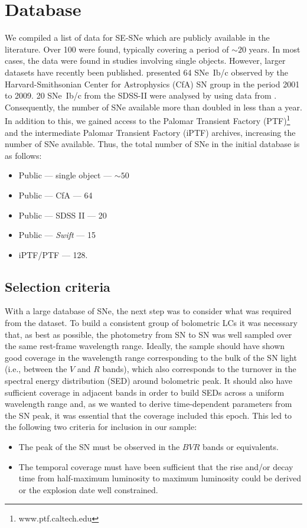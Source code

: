 \documentclass[a4paper,fleqn,usenatbib]{mnras}
\begin{document}
\section{Database}
We compiled a list of data for SE-SNe which are publicly available in the literature. Over 100 were found, typically covering a period of $\sim 20$ years. In most cases, the data were found in studies involving single objects. However, larger datasets have recently been published. \cite{Bianco2014} presented 64 SNe~Ib/c observed by the Harvard-Smithsonian Center for Astrophysics (CfA) SN group in the period 2001 to 2009. 20 SNe~Ib/c from the SDSS-II were analysed by \cite{Taddia2015} using data from \cite{Sako2014}. Consequently, the number of SNe available more than doubled in less than a year. In addition to this, we gained access to the Palomar Transient Factory (PTF)\footnote{www.ptf.caltech.edu} \citep{Law2009} and the intermediate Palomar Transient Factory (iPTF) archives, increasing the number of SNe available. Thus, the total number of SNe in the initial database is as follows: 
\begin{itemize}
	\item{Public --- single object --- $\sim 50$}
	\item{Public --- CfA --- 64}
	\item{Public --- SDSS II --- 20}
	\item{Public --- \textit{Swift} --- 15}
	\item{iPTF/PTF --- 128.}
\end{itemize}


\subsection{Selection criteria}
With a large database of SNe, the next step was to consider what was required from the dataset. To build a consistent group of bolometric LCs it was necessary that, as best as possible, the photometry from SN to SN was well sampled over the same rest-frame wavelength range. Ideally, the sample should have shown good coverage in the wavelength range corresponding to the bulk of the SN light (i.e., between the $V$ and $R$ bands), which also corresponds to the turnover in the spectral energy distribution (SED) around bolometric peak. It should also have sufficient coverage in adjacent bands in order to build SEDs across a uniform wavelength range and, as we wanted to derive time-dependent parameters from the SN peak, it was essential that the coverage included this epoch. This led to the following two criteria for inclusion in our sample:
	\begin{itemize}
		\item{The peak of the SN must be observed in the $BVR$ bands or equivalents.}					
		\item{The temporal coverage must have been sufficient that the rise and/or decay time from half-maximum luminosity to maximum luminosity could be derived or the explosion date well constrained.}
		\end{itemize}	
\end{document}
